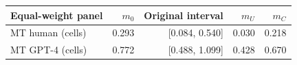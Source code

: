 \begin{tabular}{lrrrr}
\toprule
Equal-weight panel & $m_0$ & Original interval & $m_U$ & $m_C$ \\
\midrule
MT human (cells) & 0.293 & [0.084, 0.540] & 0.030 & 0.218 \\
MT GPT-4 (cells) & 0.772 & [0.488, 1.099] & 0.428 & 0.670 \\
\bottomrule
\end{tabular}
